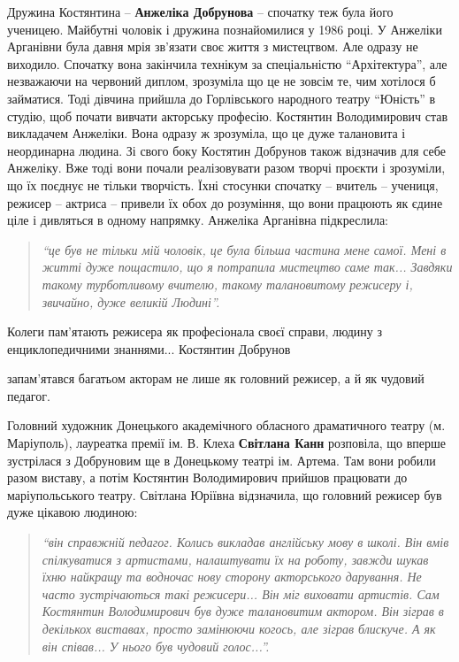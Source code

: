 
Дружина Костянтина – \textbf{Анжеліка Добрунова} – спочатку теж була його
ученицею.  Майбутні чоловік і дружина познайомилися у 1986 році. У Анжеліки
Арганівни була давня мрія зв'язати своє життя з мистецтвом. Але одразу не
виходило. Спочатку вона закінчила технікум за спеціальністю
\enquote{Архітектура}, але незважаючи на червоний диплом, зрозуміла що це не
зовсім те, чим хотілося б займатися. Тоді дівчина прийшла до Горлівського
народного театру \enquote{Юність} в студію, щоб почати вивчати акторську
професію. Костянтин Володимирович став викладачем Анжеліки.  Вона одразу ж
зрозуміла, що це дуже талановита і неординарна людина. Зі свого боку Костятин
Добрунов також відзначив для себе Анжеліку. Вже тоді вони почали реалізовувати
разом творчі проєкти і зрозуміли, що їх поєднує не тільки творчість. Їхні
стосунки спочатку – вчитель – учениця, режисер – актриса – привели їх обох до
розуміння, що вони працюють як єдине ціле і дивляться в одному напрямку.
Анжеліка Арганівна підкреслила:

\begin{quote}
\em\enquote{це був не тільки мій чоловік,
це була більша частина мене самої. Мені в житті дуже пощастило, що я потрапила
мистецтво саме так... Завдяки такому турботливому вчителю, такому талановитому
режисеру і, звичайно, дуже великій Людині}.
\end{quote}


Колеги пам'ятають режисера як професіонала своєї справи, людину з
енциклопедичними знаннями... Костянтин Добрунов\par\noindent запам'ятався багатьом акторам не
лише як головний режисер, а й як чудовий педагог.

Головний художник Донецького академічного обласного драматичного театру (м.
Маріуполь), лауреатка премії ім. В. Клеха \textbf{Світлана Канн} розповіла, що вперше
зустрілася з Добруновим ще в Донецькому театрі ім. Артема. Там вони робили
разом виставу, а потім Костянтин Володимирович прийшов працювати до
маріупольського театру. Світлана Юріївна відзначила, що головний режисер був
дуже цікавою людиною:

\begin{quote}
\em\enquote{він справжній педагог. Колись викладав англійську мову в
школі. Він вмів спілкуватися з артистами, налаштувати їх на роботу, завжди
шукав їхню найкращу та водночас нову сторону акторського дарування. Не часто
зустрічаються такі режисери... Він міг виховати артистів. Сам Костянтин
Володимирович був дуже талановитим актором. Він зіграв в декількох виставах,
просто замінюючи когось, але зіграв блискуче. А як він співав... У нього був
чудовий голос...}.
\end{quote}

